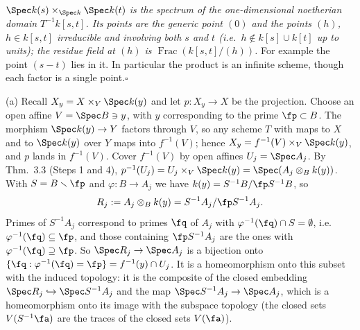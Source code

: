 \documentclass[11pt]{article}
\begin{document}
\emph{$\Spec k(s)\times_{\Spec k}\Spec k(t)$ is the spectrum of the one-dimensional noetherian domain $T^{-1}k[s,t]$. Its points are the generic point $(0)$ and the points $(h)$, $h\in k[s,t]$ irreducible and involving both $s$ and $t$ (i.e.\ $h\notin k[s]\cup k[t]$ up to units); the residue field at $(h)$ is $\operatorname{Frac}(k[s,t]/(h))$.} For example the point $(s-t)$ lies in it. In particular the product is an infinite scheme, though each factor is a single point.\hfill$\square$

\pf
(a) Recall $X_y=X\times_Y\Spec k(y)$ and let $p:X_y\to X$ be the projection. Choose an open affine $V=\Spec B\ni y$, with $y$ corresponding to the prime $\fp\subset B$. The morphism $\Spec k(y)\to Y$ factors through $V$, so any scheme $T$ with maps to $X$ and to $\Spec k(y)$ over $Y$ maps into $f^{-1}(V)$; hence $X_y=f^{-1}(V)\times_V\Spec k(y)$, and $p$ lands in $f^{-1}(V)$. Cover $f^{-1}(V)$ by open affines $U_j=\Spec A_j$. By Thm.~3.3 (Steps 1 and 4), $p^{-1}(U_j)=U_j\times_V\Spec k(y)=\Spec(A_j\otimes_Bk(y))$. With $S=B\smallsetminus\fp$ and $\varphi:B\to A_j$ we have $k(y)=S^{-1}B/\fp S^{-1}B$, so
\[R_j:=A_j\otimes_Bk(y)=S^{-1}A_j/\fp S^{-1}A_j.\]
Primes of $S^{-1}A_j$ correspond to primes $\fq$ of $A_j$ with $\varphi^{-1}(\fq)\cap S=\emptyset$, i.e.\ $\varphi^{-1}(\fq)\subseteq\fp$, and those containing $\fp S^{-1}A_j$ are the ones with $\varphi^{-1}(\fq)\supseteq\fp$. So $\Spec R_j\to\Spec A_j$ is a bijection onto $\{\fq:\varphi^{-1}(\fq)=\fp\}=f^{-1}(y)\cap U_j$. It is a homeomorphism onto this subset with the induced topology: it is the composite of the closed embedding $\Spec R_j\hookrightarrow\Spec S^{-1}A_j$ and the map $\Spec S^{-1}A_j\to\Spec A_j$, which is a homeomorphism onto its image with the subspace topology (the closed sets $V(S^{-1}\fa)$ are the traces of the closed sets $V(\fa)$).
\end{document}
